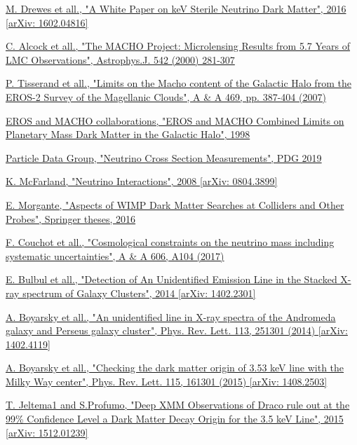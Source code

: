 \documentclass[a4paper, 10pt, openright]{report}
\begin{document}
\begin{thebibliography}{1}
\href{https://arxiv.org/pdf/1602.04816.pdf}{M. Drewes et all.,
"A White Paper on keV Sterile Neutrino Dark Matter",
2016 [arXiv: 1602.04816]
}

\href{https://arxiv.org/pdf/astro-ph/0001272}{C. Alcock et all.,
"The MACHO Project: Microlensing Results from 5.7 Years of LMC Observations",
	Astrophys.J. 542 (2000) 281-307
}

\href{https://www.aanda.org/articles/aa/pdf/2007/26/aa6017-06.pdf}{P. Tisserand et all.,
"Limits on the Macho content of the Galactic Halo from the EROS-2 Survey of the Magellanic Clouds",
A \& A 469, pp. 387-404 (2007)
}

\href{https://arxiv.org/abs/astro-ph/9803082}{EROS and MACHO collaborations,
"EROS and MACHO Combined Limits on Planetary Mass Dark Matter in the Galactic Halo",
1998
}

\href{http://pdg.lbl.gov/2019/reviews/rpp2018-rev-nu-cross-sections.pdf}{Particle Data Group,
"Neutrino Cross Section Measurements",
PDG 2019
}

\href{https://arxiv.org/pdf/0804.3899.pdf}{K. McFarland,
"Neutrino Interactions",
2008 [arXiv: 0804.3899]
}

\href{http://inspirehep.net/record/1510610}{E. Morgante,
"Aspects of WIMP Dark Matter Searches at Colliders and Other Probes",
Springer theses, 2016
}

\href{https://www.aanda.org/articles/aa/pdf/2017/10/aa30927-17.pdf}{F. Couchot et all.,
"Cosmological constraints on the neutrino mass including systematic uncertainties",
A \& A 606, A104 (2017)
}

\href{https://arxiv.org/abs/1402.2301}{E. Bulbul et all.,
"Detection of An Unidentified Emission Line in the Stacked X-ray spectrum of Galaxy Clusters",
2014 [arXiv: 1402.2301]
}

\href{https://arxiv.org/abs/1402.4119}{A. Boyarsky et all.,
"An unidentified line in X-ray spectra of the Andromeda galaxy and Perseus galaxy cluster",
Phys. Rev. Lett. 113, 251301 (2014) [arXiv: 1402.4119]
}

\href{https://arxiv.org/abs/1408.2503}{A. Boyarsky et all.,
"Checking the dark matter origin of 3.53 keV line with the Milky Way center",
Phys. Rev. Lett. 115, 161301 (2015) [arXiv: 1408.2503]
}

\href{https://arxiv.org/abs/1512.01239}{T. Jeltema1 and S.Profumo,
"Deep XMM Observations of Draco rule out at the 99\% Confidence Level a Dark Matter Decay Origin for the 3.5 keV Line",
2015 [arXiv: 1512.01239]
}


\end{thebibliography}
\end{document}
